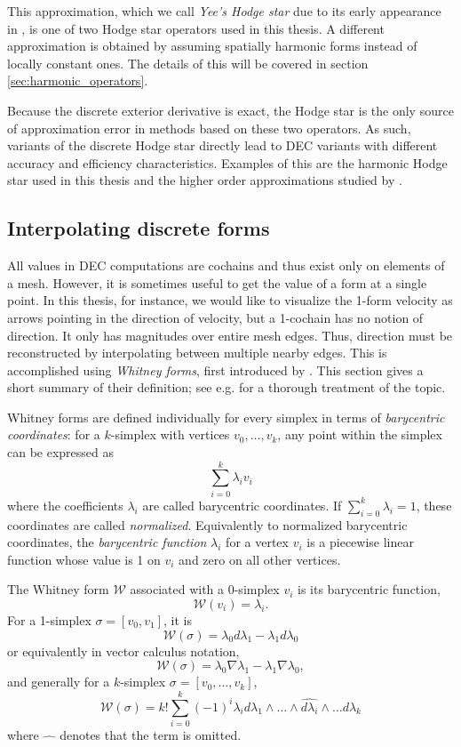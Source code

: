 \documentclass[utf8,english]{gradu3}
\begin{document}
This approximation, which we call \textit{Yee's Hodge star}
due to its early appearance in \textcite{yee_numerical_1966},
is one of two Hodge star operators used in this thesis.
A different approximation is obtained by assuming spatially harmonic forms
instead of locally constant ones.
The details of this will be covered in section \ref{sec:harmonic_operators}.

Because the discrete exterior derivative is exact,
the Hodge star is the only source of approximation error
in methods based on these two operators.
As such, variants of the discrete Hodge star directly lead to
DEC variants with different accuracy and efficiency characteristics.
Examples of this are the harmonic Hodge star used in this thesis
and the higher order approximations studied by \textcite{lohi_higher_2023}.

\subsection{Interpolating discrete forms}\label{sec:interpolation}

All values in DEC computations are cochains
and thus exist only on elements of a mesh.
However, it is sometimes useful to get the value of a form at a single point.
In this thesis, for instance, we would like to visualize
the 1-form velocity as arrows pointing in the direction of velocity,
but a 1-cochain has no notion of direction.
It only has magnitudes over entire mesh edges.
Thus, direction must be reconstructed by interpolating between multiple nearby edges.
This is accomplished using \textit{Whitney forms},
first introduced by \textcite{whitney_geometric_1957}.
This section gives a short summary of their definition;
see e.g. \textcite{lohi_whitney_2021} for a thorough treatment of the topic.

Whitney forms are defined individually for every simplex
in terms of \textit{barycentric coordinates}:
for a $k$-simplex with vertices $v_0, \dots, v_k$,
any point within the simplex can be expressed as
\[
  \sum_{i=0}^k \lambda_i v_i
\]
where the coefficients $\lambda_i$ are called barycentric coordinates.
If $\sum_{i=0}^k \lambda_i = 1$, these coordinates are called \textit{normalized}.
Equivalently to normalized barycentric coordinates,
the \textit{barycentric function} $\lambda_i$ for a vertex $v_i$
is a piecewise linear function whose value is 1 on $v_i$
and zero on all other vertices.

The Whitney form $\mathcal{W}$ associated with a 0-simplex $v_i$
is its barycentric function,
\[
  \mathcal{W}(v_i) = \lambda_i.
\]
For a 1-simplex $\sigma = [v_0,v_1]$, it is
\[
  \mathcal{W}(\sigma) = \lambda_0 d\lambda_1 - \lambda_1 d\lambda_0
\]
or equivalently in vector calculus notation,
\[
  \mathcal{W}(\sigma) = \lambda_0 \nabla\lambda_1 - \lambda_1 \nabla\lambda_0,
\]
and generally for a $k$-simplex $\sigma = [v_0,\dots,v_k]$,
\begin{equation}
  \mathcal{W}(\sigma) = k! \sum_{i=0}^{k} (-1)^i
    \lambda_i d\lambda_1 \wedge \dots \wedge \widehat{d\lambda_i}
    \wedge \dots d\lambda_k
\end{equation}
where $\widehat{\quad}$ denotes that the term is omitted.
\end{document}
